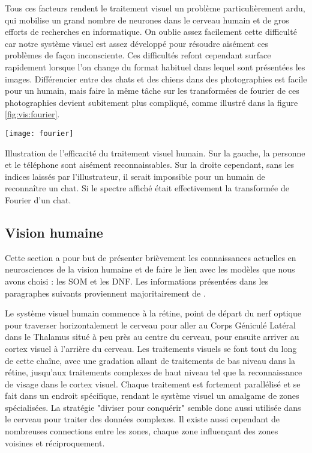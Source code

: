 	Tous ces facteurs rendent le traitement visuel un problème particulièrement ardu, qui mobilise un grand nombre de neurones dans le cerveau humain et de gros efforts de recherches en informatique. On oublie assez facilement cette difficulté car notre système visuel est assez développé pour résoudre aisément ces problèmes de façon inconsciente. Ces difficultés refont cependant surface rapidement lorsque l'on change du format habituel dans lequel sont présentées les images. Différencier entre des chats et des chiens dans des photographies est facile pour un humain, mais faire la même tâche sur les transformées de fourier de ces photographies devient subitement plus compliqué, comme illustré dans la figure \ref{fig:vis:fourier}.

	\begin{figureth}
		\texttt{[image: fourier]}
		\caption[Illustration de l'efficacité du traitement visuel humain.]{Illustration de l'efficacité du traitement visuel humain. Sur la gauche, la personne et le téléphone sont aisément reconnaissables. Sur la droite cependant, sans les indices laissés par l'illustrateur, il serait impossible pour un humain de reconnaître un chat. Si le spectre affiché était effectivement la transformée de Fourier d'un chat.\footnotemark}\label{fig:vis:fourier}
	\end{figureth}


\subsection{Vision humaine}

	Cette section a pour but de présenter brièvement les connaissances actuelles en neurosciences de la vision humaine et de faire le lien avec les modèles que nous avons choisi : les SOM et les DNF. Les informations présentées dans les paragraphes suivants proviennent majoritairement de \cite{gilbert2020constructive}.

	Le système visuel humain commence à la rétine, point de départ du nerf optique pour traverser horizontalement le cerveau pour aller au Corps Géniculé Latéral dans le Thalamus situé à peu près au centre du cerveau, pour ensuite arriver au cortex visuel à l'arrière du cerveau. Les traitements visuels se font tout du long de cette chaîne, avec une gradation allant de traitements de bas niveau dans la rétine, jusqu'aux traitements complexes de haut niveau tel que la reconnaissance de visage dans le cortex visuel. Chaque traitement est fortement parallélisé et se fait dans un endroit spécifique, rendant le système visuel un amalgame de zones spécialisées. La stratégie "diviser pour conquérir" semble donc aussi utilisée dans le cerveau pour traiter des données complexes. Il existe aussi cependant de nombreuses connections entre les zones, chaque zone influençant des zones voisines et réciproquement.


